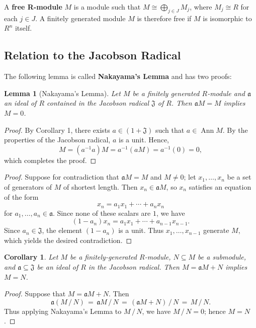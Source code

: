 \documentclass[11pt]{article}
\newtheorem{lemma}{Lemma}
\newtheorem{corollary}{Corollary}
\newcommand{\Ann}{\operatorname{Ann}}
\begin{document}
A \textbf{free R-module} $M$ is a module such that $M \cong \bigoplus_{j \in J} M_{j}$, where $M_{j} \cong R$ for each $j \in J$. A finitely generated module $M$ is therefore free if $M$ is isomorphic to $R^{n}$ itself.

\subsection{Relation to the Jacobson Radical}


The following lemma is called \textbf{Nakayama's Lemma} and has two proofs:

\begin{adjustwidth}{0.5cm}{}
	\begin{lemma}[Nakayama's Lemma]
		Let $M$ be a finitely generated $R$-module and $\mathfrak{a}$ an ideal of $R$ contained in the Jacobson radical $\mathfrak{J}$ of $R$. Then $\mathfrak{a}M = M$ implies $M = 0$.
	\end{lemma}
	\begin{proof}
		By Corollary 1, there exists $a \in (1 + \mathfrak{J})$ such that $a \in \Ann M$. By the properties of the Jacobson radical, $a$ is a unit. Hence,
		\[
			M = (a^{-1}a)M = a^{-1}(aM) = a^{-1}(0) = 0,
		\]
    which completes the proof.
	\end{proof}
	\begin{proof}
		Suppose for contradiction that $\mathfrak{a}M = M$ and $M \ne 0$; let $x_{1}, \ldots, x_{n}$ be a set of generators of $M$ of shortest length. Then $x_{n} \in \mathfrak{a}M$, so $x_{n}$ satisfies an equation of the form
		\[
			 x_{n} = a_{1} x_{1} + \cdots + a_{n} x_{n}
		\]
		for $a_{1}, \ldots, a_{n} \in \mathfrak{a}$. Since none of these scalars are $1$, we have
		\[
			(1 - a_{n})x_{n} = a_{1}x_{1} + \cdots + a_{n - 1}x_{n - 1}.
		\]
    Since $a_{n} \in \mathfrak{J}$, the element $(1 - a_{n})$ is a unit. Thus $x_{1}, \ldots, x_{n - 1}$ generate $M$, which yields the desired contradiction.
	\end{proof}
\end{adjustwidth}

\begin{adjustwidth}{0.5cm}{}
	\begin{corollary}
		Let $M$ be a finitely-generated $R$-module, $N \subseteq M$ be a submodule, and $\mathfrak{a} \subseteq \mathfrak{J}$ be an ideal of $R$ in the Jacobson radical. Then $M = \mathfrak{a}M + N$ implies $M = N$.
	\end{corollary}
	\begin{proof}
    Suppose that $M = \mathfrak{a}M + N$. Then
    \[
      \mathfrak{a}(M \, / \, N) \, = \, \mathfrak{a}M \, / \, N \, = \, (\mathfrak{a}M + N) \, / \, N \, = \, M \, / \, N.
    \]
    Thus applying Nakayama's Lemma to $M \, / \, N$, we have $M \, / \, N = 0$; hence $M = N$.
	\end{proof}
\end{adjustwidth}
\end{document}
